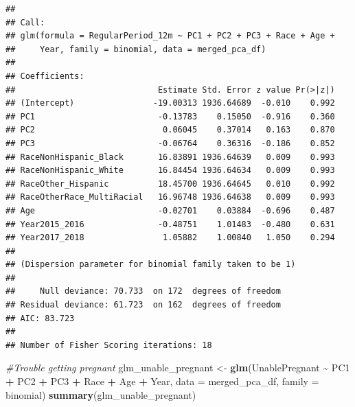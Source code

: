\documentclass[
]{article}
\newenvironment{Shaded}{\begin{snugshade}}{\end{snugshade}}
\newcommand{\AttributeTok}[1]{\textcolor[rgb]{0.13,0.29,0.53}{#1}}
\newcommand{\CommentTok}[1]{\textcolor[rgb]{0.56,0.35,0.01}{\textit{#1}}}
\newcommand{\FunctionTok}[1]{\textcolor[rgb]{0.13,0.29,0.53}{\textbf{#1}}}
\newcommand{\NormalTok}[1]{#1}
\newcommand{\OtherTok}[1]{\textcolor[rgb]{0.56,0.35,0.01}{#1}}
\newcommand{\SpecialCharTok}[1]{\textcolor[rgb]{0.81,0.36,0.00}{\textbf{#1}}}
\begin{document}
\begin{verbatim}
## 
## Call:
## glm(formula = RegularPeriod_12m ~ PC1 + PC2 + PC3 + Race + Age + 
##     Year, family = binomial, data = merged_pca_df)
## 
## Coefficients:
##                             Estimate Std. Error z value Pr(>|z|)
## (Intercept)                -19.00313 1936.64689  -0.010    0.992
## PC1                         -0.13783    0.15050  -0.916    0.360
## PC2                          0.06045    0.37014   0.163    0.870
## PC3                         -0.06764    0.36316  -0.186    0.852
## RaceNonHispanic_Black       16.83891 1936.64639   0.009    0.993
## RaceNonHispanic_White       16.84454 1936.64634   0.009    0.993
## RaceOther_Hispanic          18.45700 1936.64645   0.010    0.992
## RaceOtherRace_MultiRacial   16.96748 1936.64638   0.009    0.993
## Age                         -0.02701    0.03884  -0.696    0.487
## Year2015_2016               -0.48751    1.01483  -0.480    0.631
## Year2017_2018                1.05882    1.00840   1.050    0.294
## 
## (Dispersion parameter for binomial family taken to be 1)
## 
##     Null deviance: 70.733  on 172  degrees of freedom
## Residual deviance: 61.723  on 162  degrees of freedom
## AIC: 83.723
## 
## Number of Fisher Scoring iterations: 18
\end{verbatim}

\begin{Shaded}
\begin{Highlighting}[]
\CommentTok{\#Trouble getting pregnant}
\NormalTok{glm\_unable\_pregnant }\OtherTok{\textless{}{-}} \FunctionTok{glm}\NormalTok{(UnablePregnant }\SpecialCharTok{\textasciitilde{}}\NormalTok{ PC1 }\SpecialCharTok{+}\NormalTok{ PC2 }\SpecialCharTok{+}\NormalTok{ PC3 }\SpecialCharTok{+}\NormalTok{ Race }\SpecialCharTok{+}\NormalTok{ Age }\SpecialCharTok{+}\NormalTok{ Year, }
                                \AttributeTok{data =}\NormalTok{ merged\_pca\_df, }\AttributeTok{family =}\NormalTok{ binomial)}
\FunctionTok{summary}\NormalTok{(glm\_unable\_pregnant)}
\end{Highlighting}
\end{Shaded}
\end{document}
